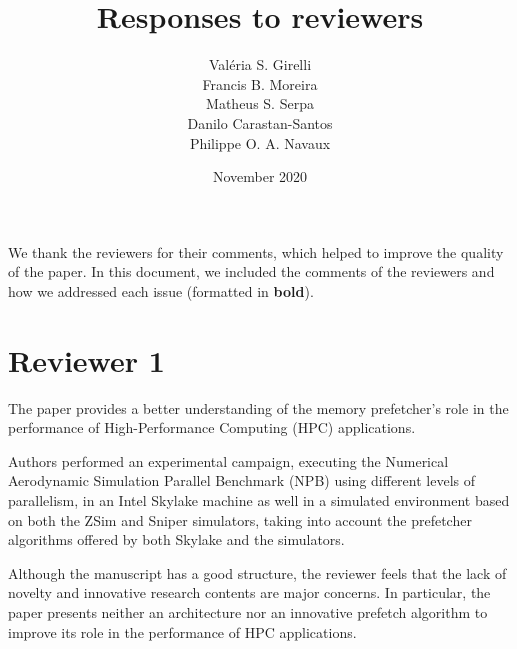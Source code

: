 \documentclass{article}
\title{Responses to reviewers}
\author{Valéria S. Girelli\\Francis B. Moreira\\Matheus S. Serpa\\Danilo Carastan-Santos\\Philippe O. A. Navaux}
\date{November 2020}
\begin{document}
\maketitle

We thank the reviewers for their comments, which helped to improve the quality of the paper.
In this document, we included the comments of the reviewers and how we addressed each issue (formatted in \textbf{bold}).

\section*{Reviewer 1}

The paper provides a better understanding of the memory prefetcher’s role in the performance of High-Performance Computing (HPC) applications.

Authors performed an experimental campaign, executing the Numerical Aerodynamic Simulation Parallel Benchmark (NPB) using different levels of parallelism, in an Intel Skylake machine as well in a simulated environment based on both the ZSim and Sniper simulators, taking into account the prefetcher algorithms offered by both Skylake and the simulators.

\vspace{.5cm} Although the manuscript has a good structure, the reviewer feels that the lack of novelty and innovative research contents are major concerns. In particular, the paper presents neither an architecture nor an innovative prefetch algorithm to improve its role in the performance of HPC applications. 
\end{document}
